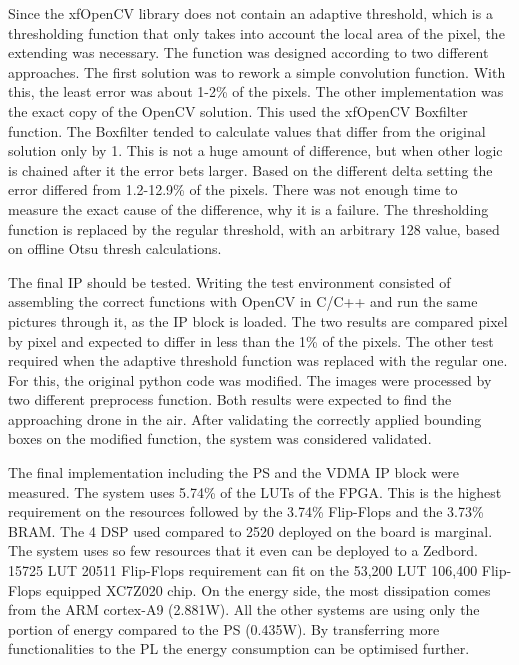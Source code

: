 Since the xfOpenCV library does not contain an adaptive threshold, which is a thresholding function that only takes into account the local area of the pixel, the extending was necessary.
The function was designed according to two different approaches.
The first solution was to rework a simple convolution function.
With this, the least error was about 1-2\% of the pixels.
The other implementation was the exact copy of the OpenCV solution.
This used the xfOpenCV Boxfilter function.
The Boxfilter tended to calculate values that differ from the original solution only by 1.
This is not a huge amount of difference, but when other logic is chained after it the error bets larger.
Based on the different delta setting the error differed from 1.2-12.9\% of the pixels.
There was not enough time to measure the exact cause of the difference, why it is a failure.
The thresholding function is replaced by the regular threshold, with an arbitrary 128 value, based on offline Otsu thresh calculations.

The final IP should be tested.
Writing the test environment consisted of assembling the correct functions with OpenCV in C/C++ and run the same pictures through it, as the IP block is loaded.
The two results are compared pixel by pixel and expected to differ in less than the 1\% of the pixels.
The other test required when the adaptive threshold function was replaced with the regular one.
For this, the original python code was modified.
The images were processed by two different preprocess function.
Both results were expected to find the approaching drone in the air.
After validating the correctly applied bounding boxes on the modified function, the system was considered validated.

The final implementation including the PS and the VDMA IP block were measured.
The system uses 5.74\% of the LUTs of the FPGA.
This is the highest requirement on the resources followed by the 3.74\% Flip-Flops and the 3.73\% BRAM.
The 4 DSP used compared to 2520 deployed on the board is marginal.
The system uses so few resources that it even can be deployed to a Zedbord.
15725 LUT 20511 Flip-Flops requirement can fit on the 53,200 LUT 106,400 Flip-Flops equipped XC7Z020 chip.
On the energy side, the most dissipation comes from the ARM cortex-A9 (2.881W).
All the other systems are using only the portion of energy compared to the PS (0.435W).
By transferring more functionalities to the PL the energy consumption can be optimised further.

\clearpage